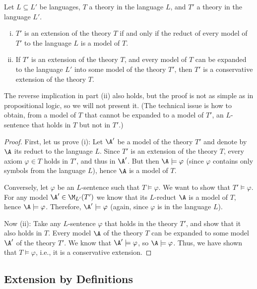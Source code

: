 \begin{proposition}\label{proposition:semantic-conditions-for-extensions}
    Let $L\subseteq L'$ be languages, $T$ a theory in the language $L$, and $T'$ a theory in the language $L'$.
    \begin{enumerate}[(i)]
        \item $T'$ is an extension of the theory $T$ if and only if the reduct of every model of $T'$ to the language $L$ is a model of $T$.
        \item If $T'$ is an extension of the theory $T$, and every model of $T$ can be expanded to the language $L'$ into some model of the theory $T'$, then $T'$ is a conservative extension of the theory $T$.
    \end{enumerate}
\end{proposition}
\begin{remark}
    The reverse implication in part (ii) also holds, but the proof is not as simple as in propositional logic, so we will not present it. (The technical issue is how to obtain, from a model of $T$ that cannot be expanded to a model of $T'$, an $L$-sentence that holds in $T$ but not in $T'$.)
\end{remark}
\begin{proof}
    First, let us prove (i): Let $\A'$ be a model of the theory $T'$ and denote by $\A$ its reduct to the language $L$. Since $T'$ is an extension of the theory $T$, every axiom $\varphi\in T$ holds in $T'$, and thus in $\A'$. But then $\A\models\varphi$ (since $\varphi$ contains only symbols from the language $L$), hence $\A$ is a model of $T$.

    Conversely, let $\varphi$ be an $L$-sentence such that $T\models\varphi$. We want to show that $T'\models\varphi$. For any model $\A'\in\M_{L'}(T')$ we know that its $L$-reduct $\A$ is a model of $T$, hence $\A\models\varphi$. Therefore, $\A'\models\varphi$ (again, since $\varphi$ is in the language $L$).

    Now (ii): Take any $L$-sentence $\varphi$ that holds in the theory $T'$, and show that it also holds in $T$. Every model $\A$ of the theory $T$ can be expanded to some model $\A'$ of the theory $T'$. We know that $\A'\models\varphi$, so $\A\models\varphi$. Thus, we have shown that $T\models\varphi$, i.e., it is a conservative extension.
\end{proof}


\subsection{Extension by Definitions}\label{subsection:extension-by-definition}

